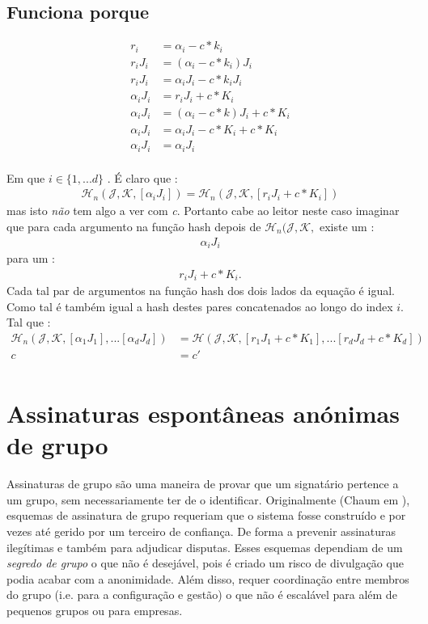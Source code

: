 \subsection*{Funciona porque}

\begin{align*}
                 r_i &= \alpha_i - c*k_i  \\
  	 r_i J_i &= (\alpha_i - c*k_i) J_i  \\
     r_i J_i &= \alpha_i J_i - c*k_i J_i  \\
\alpha_i J_i &= r_i J_i + c* K_i\\
\alpha_i J_i &= (\alpha_i - c*k) J_i + c*K_i\\
\alpha_i J_i &= \alpha_i J_i - c*K_i + c*K_i\\
\alpha_i J_i &= \alpha_i J_i\\
\end{align*}

Em que $i \in \{1,...d\}$ . É claro que :
\begin{align*}
\mathcal{H}_n(\mathcal{J},\mathcal{K},[\alpha_i J_i]) = \mathcal{H}_n(\mathcal{J},\mathcal{K},[r_i J_i + c* K_i])
\end{align*}
mas isto {\em não} tem algo a ver com {\em c}. Portanto cabe ao leitor neste caso imaginar que para cada argumento na função hash depois de $\mathcal{H}_n(\mathcal{J},\mathcal{K},$ 
\newline existe um : 
\begin{align*}
\alpha_i J_i
\end{align*}
para um :
\begin{align*}
r_i J_i + c* K_i .
\end{align*}
Cada tal par de argumentos na função hash dos dois lados da equação é igual. Como tal é também igual a hash destes pares concatenados ao longo do index $i$. Tal que :
\begin{align*}
\mathcal{H}_n(\mathcal{J},\mathcal{K},[\alpha_1 J_1],...[\alpha_d J_d]) &= \mathcal{H}(\mathcal{J},\mathcal{K},[r_1 J_1 + c*K_1],...[r_d J_d + c*K_d])\\
c &= c' \\
\end{align*}

\section{Assinaturas espontâneas anónimas de grupo}
\label{SAG_section}

Assinaturas de grupo são uma maneira de provar que um signatário pertence a um grupo, sem necessariamente ter de o identificar. Originalmente (Chaum em \cite{Chaum:1991:GS:1754868.1754897}), esquemas de assinatura de grupo requeriam que o sistema fosse construído e por vezes até gerido por um terceiro de confiança. De forma a prevenir assinaturas ilegítimas e também para adjudicar disputas. Esses esquemas dependiam de um {\em segredo de grupo} o que não é desejável, pois é criado um risco de divulgação que podia acabar com a anonimidade. Além disso, requer coordinação entre membros do grupo (i.e. para a configuração e gestão) o que não é escalável para além de pequenos grupos ou para empresas.

